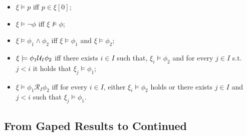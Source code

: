 \begin{itemize}
	\item $\xi\models p$ iff $p\in\xi[0]$;
    \item $\xi\models \neg \phi$ iff $\xi\not\models\phi$;
    \item $\xi\models\phi_1\wedge\phi_2$ iff $\xi\models\phi_1$ and $\xi\models\phi_2$;
    \item $\xi\models \phi_1{\mathcal{U}}_I\phi_2$ iff there exists $i\in I$ such that, $\xi_i\models\phi_2$ and for every $j\in I$ s.t. $j<i$ it holds that $\xi_j\models\phi_1$;
    \item $\xi\models \phi_1\mathcal{R}_I\phi_2$ iff for every $i\in I$, either  $\xi_i\models\phi_2$ holds or there exists $j\in I$ and $j < i$ such that $\xi_j\models\phi_1$.
\end{itemize}

\subsection{From Gaped Results to Continued}
